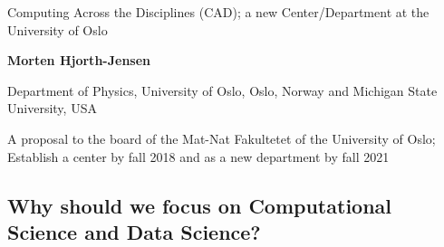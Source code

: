 \documentclass[%
oneside,                 %
final,                   %
10pt]{article}
\begin{document}

\newcommand{\exercisesection}[1]{\subsection*{#1}}






\thispagestyle{empty}

\begin{center}
{\LARGE\bf
\begin{spacing}{1.25}
Computing Across the Disciplines (CAD); a new Center/Department at the University of Oslo
\end{spacing}
}
\end{center}


\begin{center}
{\bf Morten Hjorth-Jensen}
\end{center}

    \begin{center}
\centerline{{\small Department of Physics, University of Oslo, Oslo, Norway  and Michigan State University, USA}}
\end{center}
    

\begin{center}
A proposal to the board of the Mat-Nat Fakultetet of the University of Oslo; Establish a center by fall 2018 and as a new department by fall 2021
\end{center}

\vspace{1cm}


\subsection*{Why should we focus on Computational Science and Data Science?}
\end{document}
